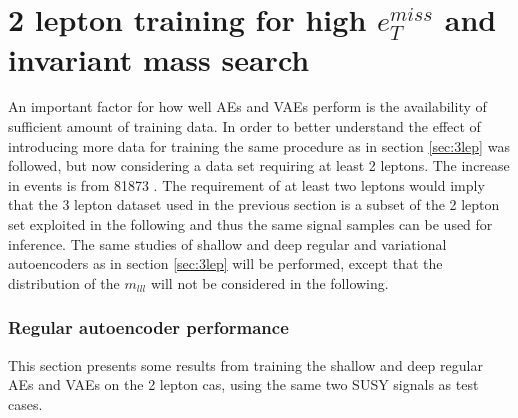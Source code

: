 
\section{2 lepton training for high $e_T^{miss}$ and invariant mass search}\label{sec:2lep}

An important factor for how well AEs and VAEs perform is the availability of sufficient amount of training data. 
In order to better understand the effect of introducing more data for training the same procedure as in section \ref{sec:3lep} 
was followed, but now considering a data set requiring at least 2 leptons. The increase in events is from 81873 .
The requirement of at least two leptons would imply that the 3 lepton 
dataset used in the previous section is a subset of the 2 lepton set exploited in the following and thus the 
same signal samples can be used for inference. The same studies of shallow and deep regular and variational 
autoencoders as in section \ref{sec:3lep} will be performed, 
except that the distribution of the $m_{lll}$ will not be considered in the following.


\subsubsection*{Regular autoencoder performance}
This section presents some results from training the shallow and deep regular AEs and VAEs on the 2 lepton cas, using 
the same two SUSY signals as test cases. 

